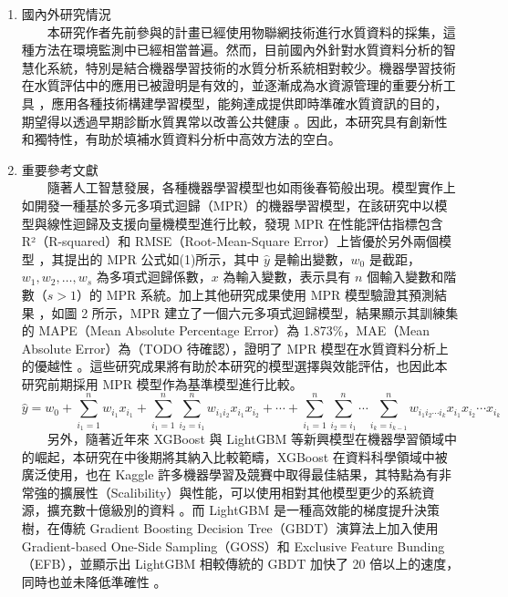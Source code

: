 \documentclass[12pt,a4paper]{article}
\begin{document}
\begin{enumerate}
\begin{enumerate}[label=\arabic*.]
\begin{enumerate}[label=1-5-\arabic*.]
    \end{enumerate}
\item 國內外研究情況\\
　　本研究作者先前參與的計畫已經使用物聯網技術進行水質資料的採集，這種方法在環境監測中已經相當普遍。然而，目前國內外針對水質資料分析的智慧化系統，特別是結合機器學習技術的水質分析系統相對較少。機器學習技術在水質評估中的應用已被證明是有效的，並逐漸成為水資源管理的重要分析工具 \cite{ref4}，應用各種技術構建學習模型，能夠達成提供即時準確水質資訊的目的，期望得以透過早期診斷水質異常以改善公共健康 \cite{ref5}。因此，本研究具有創新性和獨特性，有助於填補水質資料分析中高效方法的空白。
\item 重要參考文獻\\
　　隨著人工智慧發展，各種機器學習模型也如雨後春筍般出現。模型實作上如開發一種基於多元多項式迴歸（MPR）的機器學習模型，在該研究中以模型與線性迴歸及支援向量機模型進行比較，發現 MPR 在性能評估指標包含 R²（R-squared）和 RMSE（Root-Mean-Square Error）上皆優於另外兩個模型 \cite{ref6}，其提出的 MPR 公式如(1)所示，其中 $\hat{y}$ 是輸出變數，$w_0$ 是截距，$w_1, w_2, \ldots, w_s$ 為多項式迴歸係數，$x$ 為輸入變數，表示具有 $n$ 個輸入變數和階數（$s > 1$）的 MPR 系統。加上其他研究成果使用 MPR 模型驗證其預測結果 \cite{ref7}，如圖 2 所示，MPR 建立了一個六元多項式迴歸模型，結果顯示其訓練集的 MAPE（Mean Absolute Percentage Error）為 1.873\%，MAE（Mean Absolute Error）為（TODO 待確認），證明了 MPR 模型在水質資料分析上的優越性 \cite{ref8}。這些研究成果將有助於本研究的模型選擇與效能評估，也因此本研究前期採用 MPR 模型作為基準模型進行比較。\\
    \begin{equation}
        \hat{y} = w_0 + \sum_{i_1=1}^{n} w_{i_1} x_{i_1} + \sum_{i_1=1}^{n} \sum_{i_2=i_1}^{n} w_{i_1 i_2} x_{i_1} x_{i_2} + \cdots + \sum_{i_1=1}^{n} \sum_{i_2=i_1}^{n} \cdots \sum_{i_k=i_{k-1}}^{n} w_{i_1 i_2 \cdots i_k} x_{i_1} x_{i_2} \cdots x_{i_k}
    \end{equation}
　　另外，隨著近年來 XGBoost 與 LightGBM 等新興模型在機器學習領域中的崛起，本研究在中後期將其納入比較範疇，XGBoost 在資料科學領域中被廣泛使用，也在 Kaggle 許多機器學習及競賽中取得最佳結果，其特點為有非常強的擴展性（Scalibility）與性能，可以使用相對其他模型更少的系統資源，擴充數十億級別的資料 \cite{ref9}。而 LightGBM 是一種高效能的梯度提升決策樹，在傳統 Gradient Boosting Decision Tree（GBDT）演算法上加入使用 Gradient-based One-Side Sampling（GOSS）和 Exclusive Feature Bunding（EFB），並顯示出 LightGBM 相較傳統的 GBDT 加快了 20 倍以上的速度，同時也並未降低準確性 \cite{ref10}。\\

\end{enumerate}
\end{enumerate}
\end{document}

